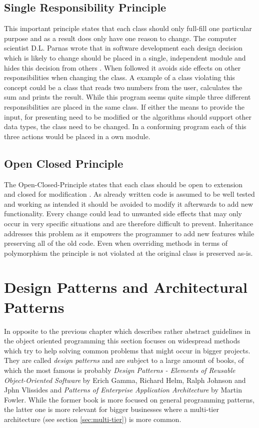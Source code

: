 \subsection{Single Responsibility Principle}
This important principle states that each class should only full-fill one particular purpose and as a result does only have one reason to change. The computer scientist D.L. Parnas wrote that in software development each design decision which is likely to change should be placed in a single, independent module and hides this decision from others \cite{srp}. When followed it avoids side effects on other responsibilities when changing the class. A example of a class violating this concept could be a class that reads two numbers from the user, calculates the sum and prints the result. While this program seems quite simple three different responsibilities are placed in the same class. If either the means to provide the input, for presenting need to be modified or the algorithms should support other data types, the class need to be changed. In a conforming program each of this three actions would be placed in a own module.

\subsection{Open Closed Principle}
The Open-Closed-Principle states that each class should be open to extension and closed for modification \cite{ocp}. As already written code is assumed to be well tested and working as intended it should be avoided to modify it afterwards to add new functionality. Every change could lead to unwanted side effects that may only occur in very specific situations and are therefore difficult to prevent. Inheritance addresses this problem as it empowers the programmer to add new features while preserving all of the old code. Even when overriding methods in terms of polymorphism the principle is not violated at the original class is preserved as-is. 

\section{Design Patterns and Architectural Patterns}
In opposite to the previous chapter which describes rather abstract guidelines in the object oriented programming this section focuses on widespread methods which try to help solving common problems that might occur in bigger projects. They are called \emph{design patterns} and are subject to a large amount of books, of which the most famous is probably \emph{Design Patterns - Elements of Reusable Object-Oriented Software} by Erich Gamma, Richard Helm, Ralph Johnson and Jphn Vlissides and \emph{Patterns of Enterprise Application Architecture} by Martin Fowler. While the former book is more focused on general programming patterns, the latter one is more relevant for bigger businesses where a multi-tier architecture (see section \ref{sec:multi-tier}) is more common. 

